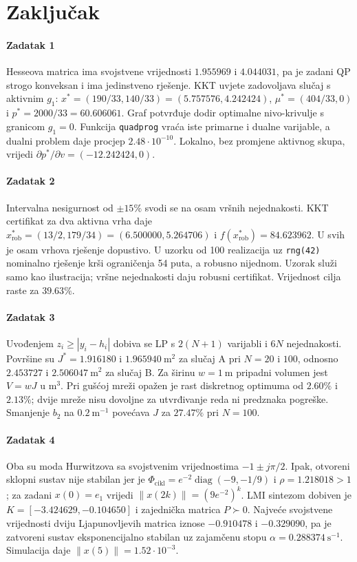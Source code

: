\section{Zaključak}

\paragraph{Zadatak 1}
Hesseova matrica ima svojstvene vrijednosti $1.955969$ i $4.044031$, pa je zadani QP strogo konveksan i ima jedinstveno rješenje. KKT uvjete zadovoljava slučaj s aktivnim $g_1$: $x^*=(190/33,140/33)=(5.757576,4.242424)$, $\mu^*=(404/33,0)$ i $p^*=2000/33=60.606061$. Graf potvrđuje dodir optimalne nivo-krivulje s granicom $g_1=0$. Funkcija \texttt{quadprog} vraća iste primarne i dualne varijable, a dualni problem daje procjep $2.48\cdot10^{-10}$. Lokalno, bez promjene aktivnog skupa, vrijedi $\partial p^*/\partial v=(-12.242424,0)$.

\paragraph{Zadatak 2}
Intervalna nesigurnost od $\pm15\%$ svodi se na osam vršnih nejednakosti. KKT certifikat za dva aktivna vrha daje $x_{\mathrm{rob}}^*=(13/2,179/34)=(6.500000,5.264706)$ i $f(x_{\mathrm{rob}}^*)=84.623962$. U svih je osam vrhova rješenje dopustivo. U uzorku od 100 realizacija uz \texttt{rng(42)} nominalno rješenje krši ograničenja 54 puta, a robusno nijednom. Uzorak služi samo kao ilustracija; vršne nejednakosti daju robusni certifikat. Vrijednost cilja raste za $39.63\%$.

\paragraph{Zadatak 3}
Uvođenjem $z_i\geq|y_i-h_i|$ dobiva se LP s $2(N+1)$ varijabli i $6N$ nejednakosti. Površine su $J^*=1.916180$ i $1.965940\ \mathrm{m}^2$ za slučaj A pri $N=20$ i $100$, odnosno $2.453727$ i $2.506047\ \mathrm{m}^2$ za slučaj B. Za širinu $w=1\ \mathrm{m}$ pripadni volumen jest $V=wJ$ u $\mathrm{m}^3$. Pri gušćoj mreži opažen je rast diskretnog optimuma od $2.60\%$ i $2.13\%$; dvije mreže nisu dovoljne za utvrđivanje reda ni predznaka pogreške. Smanjenje $b_2$ na $0.2\ \mathrm{m}^{-1}$ povećava $J$ za $27.47\%$ pri $N=100$.

\paragraph{Zadatak 4}
Oba su moda Hurwitzova sa svojstvenim vrijednostima $-1\pm j\pi/2$. Ipak, otvoreni sklopni sustav nije stabilan jer je $\Phi_{\mathrm{cikl}}=e^{-2}\operatorname{diag}(-9,-1/9)$ i $\rho=1.218018>1$; za zadani $x(0)=e_1$ vrijedi $\|x(2k)\|=(9e^{-2})^k$. LMI sintezom dobiven je $K=[-3.424629,-0.104650]$ i zajednička matrica $P\succ0$. Najveće svojstvene vrijednosti dviju Ljapunovljevih matrica iznose $-0.910478$ i $-0.329090$, pa je zatvoreni sustav eksponencijalno stabilan uz zajamčenu stopu $\alpha=0.288374\ \mathrm{s}^{-1}$. Simulacija daje $\|x(5)\|=1.52\cdot10^{-3}$.
